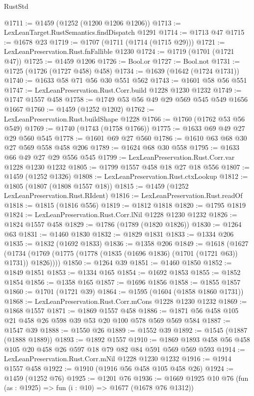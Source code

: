\begin{lexlean}{RustStd}
\begin{coremodule}
@1711 := @1459 (@1252 (@1200 @1206 @1206))
@1713 := LexLeanTarget.RustSemantics.findDispatch @1291
@1714 := @1713 @47
@1715 := @1678 @23
@1719 := @1707 (@1711 (@1714 (@1715 @29)))
@1721 := LexLeanPreservation.Rust.fnFallible @1230
@1724 := @1719 (@1701 (@1721 @47))
@1725 := @1459 @1206
@1726 := Bool.or
@1727 := Bool.not
@1731 := @1725 (@1726 (@1727 @458) @458)
@1734 := @1639 (@1642 (@1724 @1731))
@1740 := @1633 @58 @71 @56 @30 @551 @562
@1743 := @1601 @58 @56 @551
@1747 := LexLeanPreservation.Rust.Corr.build @1228 @1230 @1232
@1749 := @1747 @1557 @458
@1758 := @1749 @53 @56 @49 @29 @569 @545 @549 @1656 @1667
@1760 := @1459 (@1252 @1202)
@1762 := LexLeanPreservation.Rust.buildShape @1228
@1766 := @1760 (@1762 @53 @56 @549)
@1769 := @1740 (@1743 (@1758 @1766))
@1775 := @1633 @69 @49 @27 @29 @560 @545
@1778 := @1601 @69 @27 @560
@1786 := @1610 @63 @68 @30 @27 @569 @558 @458 @206
@1789 := @1624 @68 @30 @558
@1795 := @1633 @66 @49 @27 @29 @556 @545
@1799 := LexLeanPreservation.Rust.Corr.var @1228 @1230 @1232
@1805 := @1799 @1557 @458 @18 @27 @18 @556
@1807 := @1459 (@1252 @1326)
@1808 := LexLeanPreservation.Rust.ctxLookup
@1812 := @1805 (@1807 (@1808 @1557 @18))
@1815 := @1459 (@1252 LexLeanPreservation.Rust.RIdent)
@1816 := LexLeanPreservation.Rust.readOf
@1818 := @1815 (@1816 @556)
@1819 := @1812 @1818
@1820 := @1795 @1819
@1824 := LexLeanPreservation.Rust.Corr.lNil @1228 @1230 @1232
@1826 := @1824 @1557 @458
@1829 := @1786 (@1789 (@1820 @1826))
@1830 := @1264 @63
@1831 := @1460 @1830
@1832 := @1829 @1831
@1833 := @1334 @206
@1835 := @1832 (@1692 @1833)
@1836 := @1358 @206
@1849 := @1618
    (@1627 (@1734 (@1769 (@1775 (@1778 (@1835 (@1696 @1836) (@1701 (@1721 @63)) @1731)) @1826))))
@1850 := @1264 @39
@1851 := @1460 @1850
@1852 := @1849 @1851
@1853 := @1334 @165
@1854 := @1692 @1853
@1855 := @1852 @1854
@1856 := @1358 @165
@1857 := @1696 @1856
@1858 := @1855 @1857
@1860 := @1701 (@1721 @39)
@1864 := @1595 (@1604 (@1858 @1860 @1731))
@1868 := LexLeanPreservation.Rust.Corr.mCons @1228 @1230 @1232
@1869 := @1868 @1557
@1871 := @1869 @1557 @458
@1886 := @1871 @56 @458 @105 @21 @458 @26 @598 @39 @53 @20 @100 @578 @569 @569 @584
@1887 := @1547 @39
@1888 := @1550 @26
@1889 := @1552 @39
@1892 := @1545 (@1887 (@1888 @1889))
@1893 := @1892 @1557
@1910 := @1869 @1893 @458 @56 @458 @105 @20 @458 @26 @597 @18 @79 @82 @84 @591 @569 @569 @593
@1914 := LexLeanPreservation.Rust.Corr.mNil @1228 @1230 @1232
@1916 := @1914 @1557 @458
@1922 := @1910 (@1916 @56 @458 @105 @458 @26)
@1924 := @1459 (@1252 @76)
@1925 := @1201 @76
@1936 := @1669
    @1925
    @10
    @76
    (fun (as : @1925) => fun (i : @10) => @1677 (@1678 @76 @1312))

\end{coremodule}
\end{lexlean}
